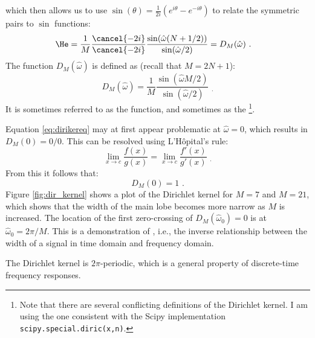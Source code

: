 \noindent which then allows us to use $\sin(\theta)=\frac{1}{2i}(e^{i\theta}-e^{-i\theta})$ to relate the
symmetric pairs to $\sin$ functions:
\begin{align}
\He &= \frac{1}{M} \frac{\cancel{-2i}}{\cancel{-2i}} \frac{ \sin(\hat{\omega} (N+1/2)) }{\sin(\hat{\omega}/2)} = D_{M}(\hat{\omega}) \,\,.
\end{align}
The function $D_M(\hat{\omega})$ is defined as (recall that $M=2N+1$):
\begin{equation}
\boxed{
D_M(\hat{\omega}) = \frac{1}{M}\frac{ \sin(\hat{\omega}M/2) }{\sin(\hat{\omega}/2)}
}\label{eq:dirikereq} \,\, _.
\end{equation}
It is sometimes referred to as the \emph{} function, and sometimes as
the \emph{}\footnote{Note that there
are several conflicting definitions of the Dirichlet kernel. I am
using the one consistent with the Scipy
implementation \texttt{scipy.special.diric(x,n)}.}.

Equation \ref{eq:dirikereq} may at first appear problematic at
$\hat{\omega}=0$, which results in $D_M(0)=0/0$. This can be resolved
using L'H\^opital's rule:
\begin{equation}
\lim_{x\rightarrow c} \frac{f(x)}{g(x)} = \lim_{x\rightarrow c} \frac{f'(x)}{g'(x)} \,\, _.
\end{equation}
From this it follows that:
\begin{equation}
D_M(0) = 1 \,\,.
\end{equation}
Figure \ref{fig:dir_kernel} shows a plot of the Dirichlet kernel for
$M=7$ and $M=21$, which shows that the width of the main lobe becomes
more narrow as $M$ is increased. The location of the first
zero-crossing of $D_M(\hat{\omega}_0)=0$ is at
$\hat{\omega}_0=2\pi/M$. This is a demonstration
of \emph{},
i.e., the inverse relationship between the width of a signal in time
domain and frequency domain.

\begin{marginfigure}
\begin{center}
\end{center}
\caption{The Dirichlet kernel is $2\pi$-periodic, which is a general property of discrete-time frequency responses.}
\label{fig:dir_kernel2}
\end{marginfigure}


